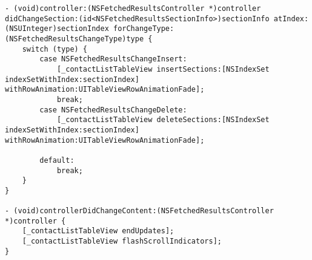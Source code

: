 \begin{lstlisting}[caption=NSFetchedResultsContoller 使用示例, label=nsfetchedresultscontroller-code]
- (void)controller:(NSFetchedResultsController *)controller didChangeSection:(id<NSFetchedResultsSectionInfo>)sectionInfo atIndex:(NSUInteger)sectionIndex forChangeType:(NSFetchedResultsChangeType)type {
    switch (type) {
        case NSFetchedResultsChangeInsert:
            [_contactListTableView insertSections:[NSIndexSet indexSetWithIndex:sectionIndex] withRowAnimation:UITableViewRowAnimationFade];
            break;
        case NSFetchedResultsChangeDelete:
            [_contactListTableView deleteSections:[NSIndexSet indexSetWithIndex:sectionIndex] withRowAnimation:UITableViewRowAnimationFade];

        default:
            break;
    }
}

- (void)controllerDidChangeContent:(NSFetchedResultsController *)controller {
    [_contactListTableView endUpdates];
    [_contactListTableView flashScrollIndicators];
}
\end{lstlisting}

